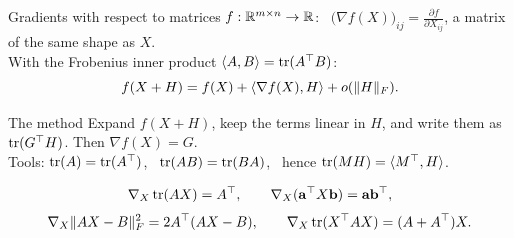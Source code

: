 \documentclass[aspectratio=1610,11pt]{beamer}
\begin{document}
\begin{frame}{Gradients with respect to matrices}
    \small
    $f: \mathbb{R}^{m \times n} \to \mathbb{R}$: \ $\big(\nabla f(X)\big)_{ij} = \frac{\partial f}{\partial X_{ij}}$, a matrix of the same shape as $X$.
    \\[0.3em]
    With the Frobenius inner product $\langle A, B \rangle = \operatorname{tr}(A^\top B)$:
    \[f(X + H) = f(X) + \langle \nabla f(X), H \rangle + o(\lVert H \rVert_F).\]
    \begin{block}{The method}
        Expand $f(X + H)$, keep the terms linear in $H$, and write them as $\operatorname{tr}(G^\top H)$. Then $\nabla f(X) = G$. \\
        Tools: $\operatorname{tr}(A) = \operatorname{tr}(A^\top)$, \ $\operatorname{tr}(AB) = \operatorname{tr}(BA)$, \ hence $\operatorname{tr}(MH) = \langle M^\top, H \rangle$.
    \end{block}
    \begin{proposition}
        \[\nabla_X\operatorname{tr}(AX) = A^\top, \qquad \nabla_X(\mathbf{a}^\top X\mathbf{b}) = \mathbf{a}\mathbf{b}^\top,\]
        \[\nabla_X\lVert AX - B \rVert_F^2 = 2A^\top(AX - B), \qquad \nabla_X\operatorname{tr}(X^\top AX) = (A + A^\top)X.\]
    \end{proposition}
\end{frame}

\end{document}
